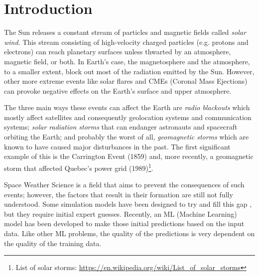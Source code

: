 \chapter{Introduction} \label{chap:intro}

The Sun releases a constant stream of particles and magnetic ﬁelds called \textit{solar wind}. This stream consisting of high-velocity charged particles (e.g. protons and electrons) can reach planetary surfaces unless thwarted by an atmosphere, magnetic ﬁeld, or both. In Earth's case, the magnetosphere and the atmosphere, to a smaller extent, block out most of the radiation emitted by the Sun. However, other more extreme events like solar flares and CMEs (Coronal Mass Ejections) can provoke negative effects on the Earth's surface and upper atmosphere. 

The three main ways these events can affect the Earth are \textit{radio blackouts} which mostly affect satellites and consequently geolocation systems and communication systems; \textit{solar radiation storms} that can endanger astronauts and spacecraft orbiting the Earth; and probably the worst of all, \textit{geomagnetic storms} which are known to have caused major disturbances in the past. The first significant example of this is the Carrington Event (1859) and, more recently, a geomagnetic storm that affected Quebec's power grid (1989)\footnote{List of solar storms: \url{https://en.wikipedia.org/wiki/List_of_solar_storms}}.

Space Weather Science is a field that aims to prevent the consequences of such events; however, the factors that result in their formation are still not fully understood. Some simulation models have been designed to try and fill this gap \cite{pinto.rouillard_MultipleFluxtubeSolar_2017, odstrcil.pizzo_ThreedimensionalPropagationCoronal_1999}, but they require initial expert guesses. Recently, an ML (Machine Learning) model has been developed \cite{barros_InitialConditionEstimation_} to make those initial predictions based on the input data. Like other ML problems, the quality of the predictions is very dependent on the quality of the training data.


